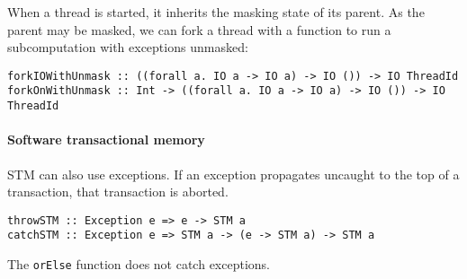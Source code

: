 When a thread is started, it inherits the masking state of its parent.  As the
parent may be masked, we can fork a thread with a function to run a
subcomputation with exceptions unmasked:

\begin{verbatim}
forkIOWithUnmask :: ((forall a. IO a -> IO a) -> IO ()) -> IO ThreadId
forkOnWithUnmask :: Int -> ((forall a. IO a -> IO a) -> IO ()) -> IO ThreadId
\end{verbatim}

\paragraph{Software transactional memory}
STM can also use exceptions.  If an exception propagates uncaught to the top of
a transaction, that transaction is aborted.

\begin{verbatim}
throwSTM :: Exception e => e -> STM a
catchSTM :: Exception e => STM a -> (e -> STM a) -> STM a
\end{verbatim}

The \verb|orElse| function does not catch exceptions.
